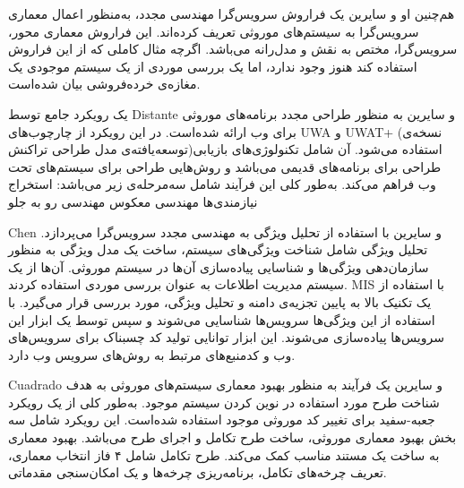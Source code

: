 هم‌چنین او و سایرین یک فراروش سرویس‌گرا مهندسی مجدد، به‌منظور اعمال معماری سرویس‌گرا به سیستم‌های موروثی تعریف کرده‌اند. این فراروش معماری محور، سرویس‌گرا، مختص به نقش و مدل‌رانه می‌باشد. اگرچه مثال کاملی که از این فراروش استفاده کند هنوز وجود ندارد، اما یک بررسی موردی از یک سیستم موجودی یک مغازه‌ی خرده‌فروشی بیان شده‌است.

یک رویکرد جامع توسط Distante و سایرین به منظور طراحی مجدد برنامه‌های موروثی برای وب ارائه شده‌است. در این رویکرد از چارچوب‌های UWA و UWAT+ (نسخه‌ی توسعه‌یافته‌ی مدل طراحی تراکنش)استفاده می‌شود. آن شامل تکنولوژی‌های بازیابی طراحی برای برنامه‌های قدیمی می‌باشد و روش‌هایی طراحی برای سیستم‌های تحت وب فراهم می‌کند. به‌طور کلی این فرآیند شامل سه‌مرحله‌ی زیر می‌باشد:
 استخراج نیازمندی‌ها
 مهندسی معکوس
 مهندسی رو به جلو

Chen و سایرین با استفاده از تحلیل ویژگی به مهندسی مجدد سرویس‌گرا می‌پردازد. تحلیل ویژگی شامل شناخت ویژگی‌های سیستم، ساخت یک مدل ویژگی به منظور سازمان‌دهی ویژگی‌ها و شناسایی پیاده‌سازی آن‌ها در سیستم موروثی. آن‌ها از یک سیستم مدیریت اطلاعات به عنوان بررسی موردی استفاده کردند. MIS با استفاده از یک تکنیک بالا به پایین تجزیه‌ی دامنه و تحلیل ویژگی، مورد بررسی قرار می‌گیرد. با استفاده از این ویژگی‌ها سرویس‌ها شناسایی می‌شوند و سپس توسط یک ابزار این سرویس‌ها پیاده‌سازی می‌شوند. این ابزار توانایی تولید کد چسبناک برای سرویس‌های وب و کدمنبع‌های مرتبط به روش‌های سرویس وب دارد.

Cuadrado و سایرین یک فرآیند به منظور بهبود معماری سیستم‌های موروثی به هدف شناخت طرح مورد استفاده در نوین کردن سیستم موجود. به‌طور کلی از یک رویکرد جعبه‌-سفید برای تغییر کد موروثی موجود استفاده شده‌است. این رویکرد شامل سه بخش بهبود معماری موروثی، ساخت طرح تکامل و اجرای طرح می‌باشد. بهبود معماری به ساخت یک مستند مناسب کمک می‌کند. طرح تکامل شامل ۴ فاز انتخاب معماری، تعریف چرخه‌های تکامل، برنامه‌ریزی چرخه‌ها و یک امکان‌سنجی مقدماتی. 

